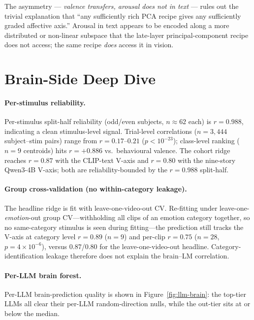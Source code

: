The asymmetry --- \emph{valence transfers, arousal does not in text} ---
rules out the trivial explanation that ``any sufficiently rich PCA
recipe gives any sufficiently graded affective axis.'' Arousal in text
appears to be encoded along a more distributed or non-linear subspace
that the late-layer principal-component recipe does not access; the
same recipe \emph{does} access it in vision.


\section{Brain-Side Deep Dive}
\label{app:brain-deep-dive}

\paragraph{Per-stimulus reliability.} Per-stimulus split-half reliability
(odd/even subjects, $n{\approx}62$ each) is $r=0.988$, indicating a
clean stimulus-level signal. Trial-level correlations
($n=3{,}444$ subject--stim pairs) range from $r=0.17$--$0.21$
($p<10^{-23}$); class-level ranking ($n=9$ centroids) hits $r=+0.886$
vs.\ behavioural valence. The cohort ridge reaches $r=0.87$ with the
CLIP-text V-axis and $r=0.80$ with the nine-story Qwen3-4B V-axis; both
are reliability-bounded by the $r=0.988$ split-half.

\paragraph{Group cross-validation (no within-category leakage).} The
headline ridge is fit with leave-one-video-out CV. Re-fitting under
leave-one-\emph{emotion}-out group CV---withholding all clips of an
emotion category together, so no same-category stimulus is seen during
fitting---the prediction still tracks the V-axis at category level
$r{=}0.89$ ($n{=}9$) and per-clip $r{=}0.75$ ($n{=}28$,
$p{=}4{\times}10^{-6}$), versus $0.87$/$0.80$ for the leave-one-video-out
headline. Category-identification leakage therefore does not explain the
brain--LM correlation.

\paragraph{Per-LLM brain forest.}
Per-LLM brain-prediction quality is shown in
Figure~\ref{fig:llm-brain}: the top-tier LLMs all clear their per-LLM
random-direction nulls, while the out-tier sits at or below the median.

